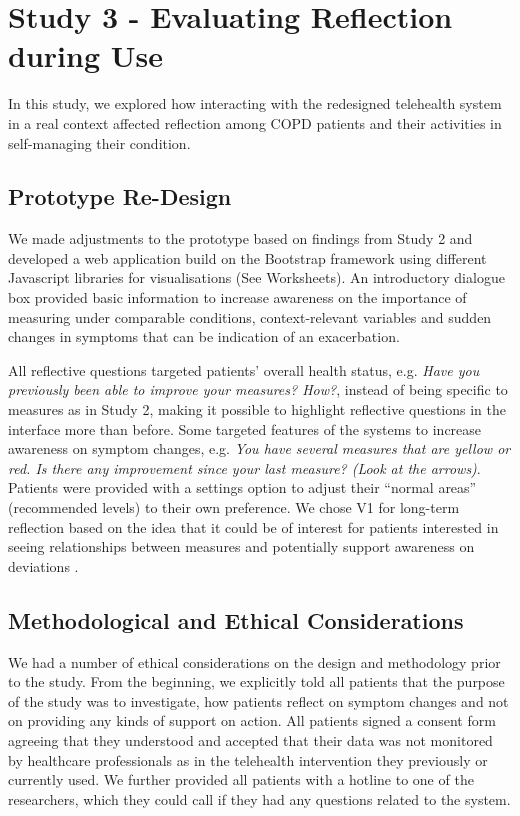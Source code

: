 \section{Study 3 - Evaluating Reflection during Use} 
In this study, we explored how interacting with the redesigned telehealth system in a real context affected reflection among COPD patients and their activities in self-managing their condition. 

\subsection{Prototype Re-Design}
We made adjustments to the prototype based on findings from Study 2 and developed a web application build on the Bootstrap framework using different Javascript libraries for visualisations (See Worksheets). An introductory dialogue box provided basic information to increase awareness on the importance of measuring under comparable conditions, context-relevant variables and sudden changes in symptoms that can be indication of an exacerbation. 

All reflective questions targeted patients’ overall health status, e.g. \textit{Have you previously been able to improve your measures? How?}, instead of being specific to measures as in Study 2, making it possible to highlight reflective questions in the interface more than before. Some targeted features of the systems to increase awareness on symptom changes, e.g. \textit{You have several measures that are yellow or red. Is there any improvement since your last measure? (Look at the arrows)}. Patients were provided with a settings option to adjust their “normal areas” (recommended levels) to their own preference. We chose V1 for long-term reflection based on the idea that it could be of interest for patients interested in seeing relationships between measures and potentially support awareness on deviations \cite{Rivera, Cuttone}. 

\subsection{Methodological and Ethical Considerations}
We had a number of ethical considerations on the design and methodology prior to the study. From the beginning, we explicitly told all patients that the purpose of the study was to investigate, how patients reflect on symptom changes and not on providing any kinds of support on action. All patients signed a consent form agreeing that they understood and accepted that their data was not monitored by healthcare professionals as in the telehealth intervention they previously or currently used. We further provided all patients with a hotline to one of the researchers, which they could call if they had any questions related to the system.

